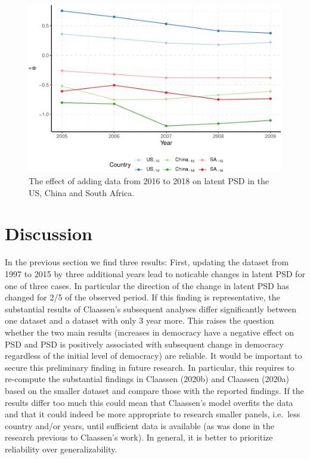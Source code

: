 \documentclass[12pt,english,a4paper,oneside]{article}
\theoremstyle{definition}
\theoremstyle{definition}
\theoremstyle{definition}
\theoremstyle{definition}
\theoremstyle{remark}
\begin{document}
\begin{figure}[H]
\includegraphics[width=\textwidth]{figs/data-1} \caption[The effect of adding data from 2016 to 2018 on latent PSD in the US, China and South Africa]{The effect of adding data from 2016 to 2018 on latent PSD in the US, China and South Africa.}\label{fig:data}
\end{figure}

\hypertarget{discussion}{%
\section{Discussion}\label{discussion}}

In the previous section we find three results: First, updating the dataset from 1997 to 2015 by three additional years lead to noticable changes in latent PSD for one of three cases. In particular the direction of the change in latent PSD has changed for 2/5 of the observed period. If this finding is representative, the substantial results of Claassen's subsequent analyses differ significantly between one dataset and a dataset with only 3 year more. This raises the question whether the two main results (increases in democracy have a negative effect on PSD and PSD is positively associated with subsequent change in democracy regardless of the initial level of democracy) are reliable. It would be important to secure this preliminary finding in future research. In particular, this requires to re-compute the substantial findings in Claassen (2020b) and Claassen (2020a) based on the smaller dataset and compare those with the reported findings. If the results differ too much this could mean that Claassen's model overfits the data and that it could indeed be more appropriate to research smaller panels, i.e.~less country and/or years, until sufficient data is available (as was done in the research previous to Claassen's work). In general, it is better to prioritize reliability over generalizability.
\end{document}
